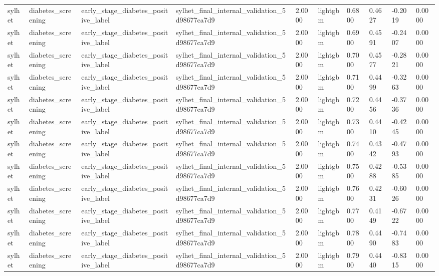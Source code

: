 \begin{tabular}{llllllllll}
sylhet & diabetes\_screening & early\_stage\_diabetes\_positive\_label & sylhet\_final\_internal\_validation\_5d98677ca7d9 & 2.0000 & lightgbm & 0.6800 & 0.4627 & -0.2019 & 0.0000 \\
sylhet & diabetes\_screening & early\_stage\_diabetes\_positive\_label & sylhet\_final\_internal\_validation\_5d98677ca7d9 & 2.0000 & lightgbm & 0.6900 & 0.4591 & -0.2407 & 0.0000 \\
sylhet & diabetes\_screening & early\_stage\_diabetes\_positive\_label & sylhet\_final\_internal\_validation\_5d98677ca7d9 & 2.0000 & lightgbm & 0.7000 & 0.4577 & -0.2821 & 0.0000 \\
sylhet & diabetes\_screening & early\_stage\_diabetes\_positive\_label & sylhet\_final\_internal\_validation\_5d98677ca7d9 & 2.0000 & lightgbm & 0.7100 & 0.4499 & -0.3263 & 0.0000 \\
sylhet & diabetes\_screening & early\_stage\_diabetes\_positive\_label & sylhet\_final\_internal\_validation\_5d98677ca7d9 & 2.0000 & lightgbm & 0.7200 & 0.4456 & -0.3736 & 0.0000 \\
sylhet & diabetes\_screening & early\_stage\_diabetes\_positive\_label & sylhet\_final\_internal\_validation\_5d98677ca7d9 & 2.0000 & lightgbm & 0.7300 & 0.4410 & -0.4245 & 0.0000 \\
sylhet & diabetes\_screening & early\_stage\_diabetes\_positive\_label & sylhet\_final\_internal\_validation\_5d98677ca7d9 & 2.0000 & lightgbm & 0.7400 & 0.4342 & -0.4793 & 0.0000 \\
sylhet & diabetes\_screening & early\_stage\_diabetes\_positive\_label & sylhet\_final\_internal\_validation\_5d98677ca7d9 & 2.0000 & lightgbm & 0.7500 & 0.4288 & -0.5385 & 0.0000 \\
sylhet & diabetes\_screening & early\_stage\_diabetes\_positive\_label & sylhet\_final\_internal\_validation\_5d98677ca7d9 & 2.0000 & lightgbm & 0.7600 & 0.4231 & -0.6026 & 0.0000 \\
sylhet & diabetes\_screening & early\_stage\_diabetes\_positive\_label & sylhet\_final\_internal\_validation\_5d98677ca7d9 & 2.0000 & lightgbm & 0.7700 & 0.4149 & -0.6722 & 0.0000 \\
sylhet & diabetes\_screening & early\_stage\_diabetes\_positive\_label & sylhet\_final\_internal\_validation\_5d98677ca7d9 & 2.0000 & lightgbm & 0.7800 & 0.4490 & -0.7483 & 0.0000 \\
sylhet & diabetes\_screening & early\_stage\_diabetes\_positive\_label & sylhet\_final\_internal\_validation\_5d98677ca7d9 & 2.0000 & lightgbm & 0.7900 & 0.4440 & -0.8315 & 0.0000 \\

\end{tabular}
